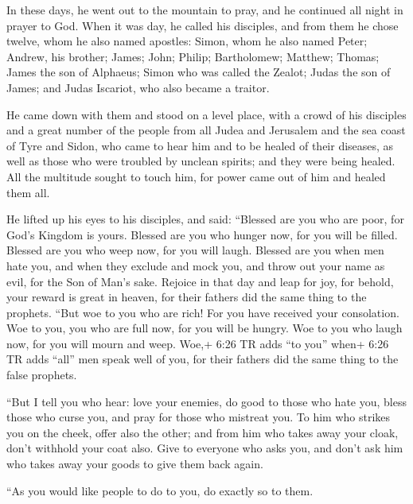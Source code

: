  In these days, he went out to the mountain to pray, and he
continued all night in prayer to God.  When it was day, he
called his disciples, and from them he chose twelve, whom he also named
apostles:  Simon, whom he also named Peter; Andrew, his
brother; James; John; Philip; Bartholomew;  Matthew;
Thomas; James the son of Alphaeus; Simon who was called the Zealot;
 Judas the son of James; and Judas Iscariot, who also
became a traitor.

 He came down with them and stood on a level place, with a
crowd of his disciples and a great number of the people from all Judea
and Jerusalem and the sea coast of Tyre and Sidon, who came to hear him
and to be healed of their diseases,  as well as those who
were troubled by unclean spirits; and they were being healed.
 All the multitude sought to touch him, for power came out
of him and healed them all.

 He lifted up his eyes to his disciples, and said:
``Blessed are you who are poor, for God's Kingdom is yours.
 Blessed are you who hunger now, for you will be filled.
Blessed are you who weep now, for you will laugh.  Blessed
are you when men hate you, and when they exclude and mock you, and throw
out your name as evil, for the Son of Man's sake.  Rejoice
in that day and leap for joy, for behold, your reward is great in
heaven, for their fathers did the same thing to the prophets.
 ``But woe to you who are rich! For you have received your
consolation.  Woe to you, you who are full now, for you
will be hungry. Woe to you who laugh now, for you will mourn and weep.
 Woe,+ 6:26 TR adds ``to you'' when+ 6:26 TR adds ``all''
men speak well of you, for their fathers did the same thing to the false
prophets.

 ``But I tell you who hear: love your enemies, do good to
those who hate you,  bless those who curse you, and pray
for those who mistreat you.  To him who strikes you on the
cheek, offer also the other; and from him who takes away your cloak,
don't withhold your coat also.  Give to everyone who asks
you, and don't ask him who takes away your goods to give them back
again.

 ``As you would like people to do to you, do exactly so to
them.

